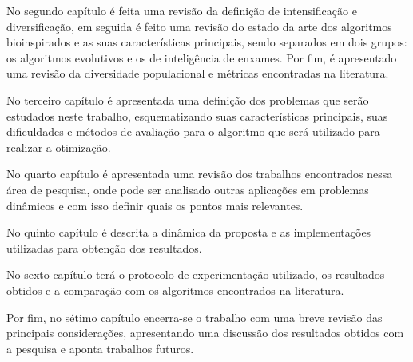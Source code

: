 No segundo capítulo é feita uma revisão da definição de intensificação e diversificação, em seguida é feito uma revisão do estado da arte dos algoritmos bioinspirados e as suas características principais, sendo separados em dois grupos: os algoritmos evolutivos e os de inteligência de enxames. Por fim, é apresentado uma revisão da diversidade populacional e métricas encontradas na literatura.

No terceiro capítulo é apresentada uma definição dos problemas que serão estudados neste trabalho, esquematizando suas características principais, suas dificuldades e métodos de avaliação para o algoritmo que será utilizado para realizar a otimização.

No quarto capítulo é apresentada uma revisão dos trabalhos encontrados nessa área de pesquisa, onde pode ser analisado outras aplicações em problemas dinâmicos e com isso definir quais os pontos mais relevantes.

No quinto capítulo é descrita a dinâmica da proposta e as implementações utilizadas para obtenção dos resultados.

No sexto capítulo terá o protocolo de experimentação utilizado, os resultados obtidos e a comparação com os algoritmos encontrados na literatura.

Por fim, no sétimo capítulo encerra-se o trabalho com uma breve revisão das principais considerações, apresentando uma discussão dos resultados obtidos com a pesquisa e aponta trabalhos futuros.
